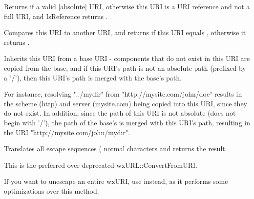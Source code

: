 \label{wxuriisreference}


Returns \true if a valid [absolute] URI, otherwise this URI
is a URI reference and not a full URI, and IsReference
returns \false.


\label{wxurioperatorcompare}


Compares this URI to another URI, and returns \true if 
this URI equals , otherwise it returns \false.



\label{wxuriresolve}


Inherits this URI from a base URI - components that do not
exist in this URI are copied from the base, and if this URI's
path is not an absolute path (prefixed by a '/'), then this URI's
path is merged with the base's path.

For instance, resolving "../mydir" from "http://mysite.com/john/doe" 
results in the scheme (http) and server (mysite.com) being copied into 
this URI, since they do not exist.  In addition, since the path
of this URI is not absolute (does not begin with '/'), the path
of the base's is merged with this URI's path, resulting in the URI
"http://mysite.com/john/mydir".


\label{wxuriunescape}


Translates all escape sequences (%
normal characters and returns the result.

This is the preferred over deprecated wxURL::ConvertFromURI.

If you want to unescape an entire wxURI, use  instead,
as it performs some optimizations over this method.



